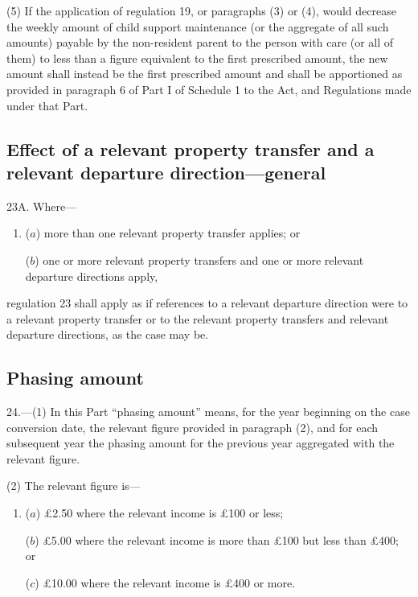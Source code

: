 \documentclass[12pt,a4paper]{article}
\begin{document}
(5) If the application of regulation 19, or paragraphs (3) or (4), would decrease the weekly amount of child support maintenance (or the aggregate of all such amounts) payable by the non-resident parent to the person with care (or all of them) to less than a figure equivalent to the first prescribed amount, the new amount shall instead be the first prescribed amount and shall be apportioned as provided in paragraph 6 of Part I of Schedule 1 to the Act, and Regulations made under that Part.


\subsection[23A. Effect of a relevant property transfer and a relevant departure direction—general]{Effect of a relevant property transfer and a relevant departure direction—general}

23A.  Where—
\begin{enumerate}\item[]
($a$) more than one relevant property transfer applies; or

($b$) one or more relevant property transfers and one or more relevant departure directions apply,
\end{enumerate}
regulation 23 shall apply as if references to a relevant departure direction were to a relevant property transfer or to the relevant property transfers and relevant departure directions, as the case may be.


\subsection[24. Phasing amount]{Phasing amount}

24.---(1)  In this Part “phasing amount” means, for the year beginning on the case conversion date, the relevant figure provided in paragraph (2), and for each subsequent year the phasing amount for the previous year aggregated with the relevant figure.

(2) The relevant figure is—
\begin{enumerate}\item[]
($a$) £2.50 where the relevant income is £100 or less;

($b$) £5.00 where the relevant income is more than £100 but less than £400; or

($c$) £10.00 where the relevant income is £400 or more.
\end{enumerate}
\end{document}
